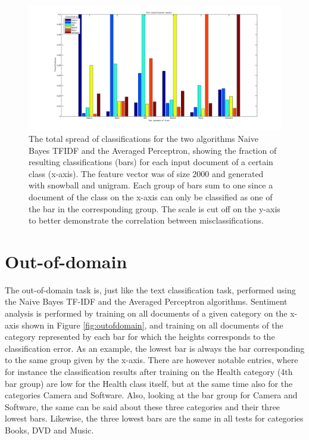 \begin{figure}[h!]
	\centering
	\includegraphics[width=1\linewidth]{../Plottar/text_categorization.png}
	\caption{The total spread of classifications for the two algorithms Naive Bayes TFIDF and the Averaged Perceptron, showing the fraction of resulting classifications (bars) for each input document of a certain class (x-axis). The feature vector was of size 2000 and generated with snowball and unigram. Each group of bars sum to one since a document of the class on the x-axis can only be classified as one of the bar in the corresponding group. The scale is cut off on the y-axis to better demonstrate the correlation between misclassifications.}
	\label{fig:textcategorization}
\end{figure}  



\section{Out-of-domain}
The out-of-domain task is, just like the text classification task, performed using the Naive Bayes TF-IDF and the Averaged Perceptron algorithms. Sentiment analysis is performed by training on all documents of a given category on the x-axis shown in Figure \ref{fig:outofdomain}, and training on all documents of the category represented by each bar for which the heights corresponds to the classification error. As an example, the lowest bar is always the bar corresponding to the same group given by the x-axis. There are however notable entries, where for instance the classification results after training on the Health category (4th bar group) are low for the Health class itself, but at the same time also for the categories Camera and Software. Also, looking at the bar group for Camera and Software, the same can be said about these three categories and their three lowest bars. Likewise, the three lowest bars are the same in all tests for categories Books, DVD and Music.\\\\\\\\\\

